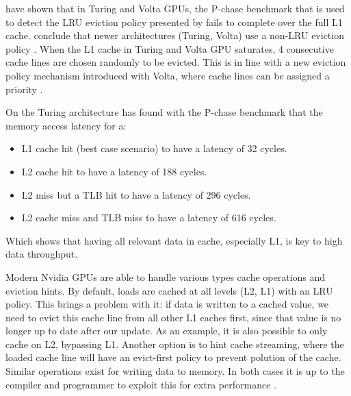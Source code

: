 \citet{jia2019dissecting} have shown that in Turing and Volta GPUs, the P-chase benchmark that is used to detect the LRU eviction policy presented by \citet{mei2016dissecting} fails to complete over the full L1 cache.
\citeauthor{jia2019dissecting} conclude that newer architectures (Turing, Volta) use a non-LRU eviction policy \cite{jia2019dissecting, jia2018dissecting,mei2016dissecting}.
When the L1 cache in Turing and Volta GPU saturates, 4 consecutive cache lines are chosen randomly to be evicted.
This is in line with a new eviction policy mechanism introduced with Volta, where cache lines can be assigned a priority \cite{jia2019dissecting,nvidia2021cudadocs}.

On the Turing architecture \citet{jia2019dissecting} has found with the P-chase benchmark that the memory access latency for a:
\begin{itemize}
    \item L1 cache hit (best case scenario) to have a latency of 32 cycles.
    \item L2 cache hit to have a latency of 188 cycles.
    \item L2 miss but a TLB hit to have a latency of 296 cycles.
    \item L2 cache miss and TLB miss to have a latency of 616 cycles.
\end{itemize}
Which shows that having all relevant data in cache, especially L1, is key to high data throughput.

Modern Nvidia GPUs are able to handle various types cache operations and eviction hints.
By default, loads are cached at all levels (L2, L1) with an LRU policy.
This brings a problem with it: if data is written to a cached value, we need to evict this cache line from all other L1 caches first, since that value is no longer up to date after our update.
As an example, it is also possible to only cache on L2, bypassing L1.
Another option is to hint cache streaming, where the loaded cache line will have an evict-first policy to prevent polution of the cache.
Similar operations exist for writing data to memory.
In both cases it is up to the compiler and programmer to exploit this for extra performance \cite{nvidia2021cudadocs}.


